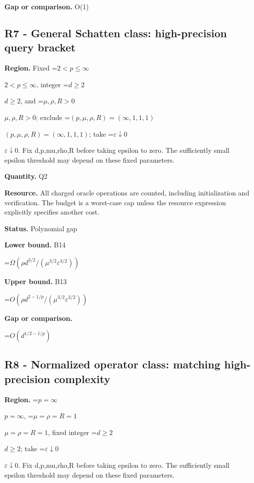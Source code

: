 \documentclass[10pt,a4paper]{article}
\newcommand{\AtlasMath}[1]{\par\begingroup\centering\setbox0=\hbox{$\displaystyle #1$}\ifdim\wd0>1.4\linewidth\typeout{ATLAS WIDE FORMULA: \the\wd0}\fi\ifdim\wd0>\linewidth\resizebox{\linewidth}{!}{\box0}\else\box0\fi\par\endgroup}
\newcommand{\AtlasInlineMath}[1]{\begingroup\setbox0=\hbox{$#1$}\ifdim\wd0>.4\linewidth\endgroup\AtlasMath{#1}\else\endgroup$#1$\fi}
\begin{document}
\textbf{Gap or comparison.} O(1)



\subsection{R7 - General Schatten class: high-precision query bracket}


\textbf{Region.} Fixed \AtlasInlineMath{2<p\le\infty}, integer \AtlasInlineMath{d\ge2}, and \AtlasInlineMath{\mu,\rho,R>0}; exclude \AtlasInlineMath{(p,\mu,\rho,R)=(\infty,1,1,1)}; take \AtlasInlineMath{\varepsilon\downarrow0}. Fix d,p,mu,rho,R before taking epsilon to zero. The sufficiently small epsilon threshold may depend on these fixed parameters.



\textbf{Quantity.} Q2



\textbf{Resource.} All charged oracle operations are counted, including initialization and verification. The budget is a worst-case cap unless the resource expression explicitly specifies another cost.



\textbf{Status.} Polynomial gap



\textbf{Lower bound.} B14



\AtlasMath{\Omega(\rho d^{3/2}/(\mu^{3/2}\varepsilon^{3/2}))}


\textbf{Upper bound.} B13



\AtlasMath{O(\rho d^{2-1/p}/(\mu^{3/2}\varepsilon^{3/2}))}


\textbf{Gap or comparison.}



\AtlasMath{O(d^{1/2-1/p})}


\subsection{R8 - Normalized operator class: matching high-precision complexity}


\textbf{Region.} \AtlasInlineMath{p=\infty}, \AtlasInlineMath{\mu=\rho=R=1}, fixed integer \AtlasInlineMath{d\ge2}; take \AtlasInlineMath{\varepsilon\downarrow0}. Fix d,p,mu,rho,R before taking epsilon to zero. The sufficiently small epsilon threshold may depend on these fixed parameters.
\end{document}

